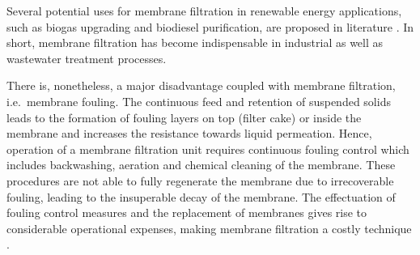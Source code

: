 Several potential uses for membrane filtration in renewable energy applications, such as biogas upgrading and biodiesel purification, are proposed in literature \citep{Charcosset2014,Dube2007}. In short, membrane filtration has become indispensable in industrial as well as wastewater treatment processes. \par %
There is, nonetheless, a major disadvantage coupled with membrane filtration, i.e.\ membrane fouling. The continuous feed and retention of suspended solids leads to the formation of fouling layers on top (filter cake) or inside the membrane and increases the resistance towards liquid permeation. Hence, operation of a membrane filtration unit requires continuous fouling control which includes backwashing, aeration and chemical cleaning of the membrane. These procedures are not able to fully regenerate the membrane due to irrecoverable fouling, leading to the insuperable decay of the membrane. The effectuation of fouling control measures and the replacement of membranes gives rise to considerable operational expenses, making membrane filtration a costly technique \citep{Owen1995}.



